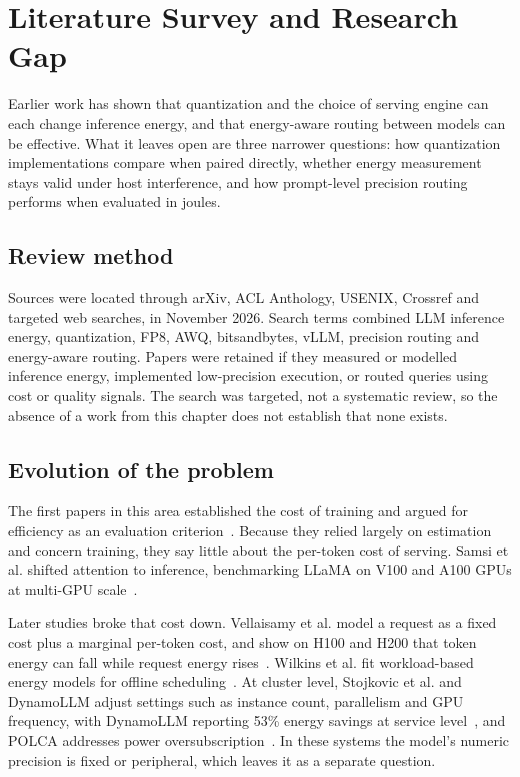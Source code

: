 \chapter{Literature Survey and Research Gap}
Earlier work has shown that quantization and the choice of serving engine can each change inference energy, and that energy-aware routing between models can be effective. What it leaves open are three narrower questions: how quantization implementations compare when paired directly, whether energy measurement stays valid under host interference, and how prompt-level precision routing performs when evaluated in joules.

\section{Review method}
Sources were located through arXiv, ACL Anthology, USENIX, Crossref and targeted web searches, in November 2026. Search terms combined LLM inference energy, quantization, FP8, AWQ, bitsandbytes, vLLM, precision routing and energy-aware routing. Papers were retained if they measured or modelled inference energy, implemented low-precision execution, or routed queries using cost or quality signals. The search was targeted, not a systematic review, so the absence of a work from this chapter does not establish that none exists.

\section{Evolution of the problem}
The first papers in this area established the cost of training and argued for efficiency as an evaluation criterion~\cite{b1,b2,b3,b4}. Because they relied largely on estimation and concern training, they say little about the per-token cost of serving. Samsi et al. shifted attention to inference, benchmarking LLaMA on V100 and A100 GPUs at multi-GPU scale~\cite{b5}.

Later studies broke that cost down. Vellaisamy et al. model a request as a fixed cost plus a marginal per-token cost, and show on H100 and H200 that token energy can fall while request energy rises~\cite{b8}. Wilkins et al. fit workload-based energy models for offline scheduling~\cite{b9}. At cluster level, Stojkovic et al. and DynamoLLM adjust settings such as instance count, parallelism and GPU frequency, with DynamoLLM reporting 53\% energy savings at service level~\cite{b10,b11}, and POLCA addresses power oversubscription~\cite{b12}. In these systems the model's numeric precision is fixed or peripheral, which leaves it as a separate question.

